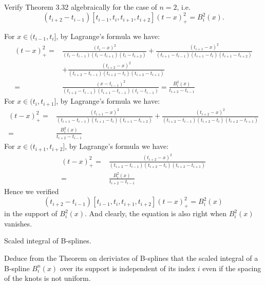 \documentclass[11pt]{elegantbook}
\begin{document}
\vspace{1.5em}

\begin{problem}
  Verify Theorem 3.32 algebraically for the case of $n=2$, i.e.
  \begin{equation*}
    (t_{i+2}-t_{i-1})[t_{i-1},t_i,t_{i+1},t_{i+2}](t-x)_+^2=B_i^2(x).
  \end{equation*}
\end{problem}

\begin{solution}
  For $x\in(t_{i-1},t_i]$, by Lagrange's formula we have:
  \begin{align*}
    [t_{i-1},t_i,t_{i+1},t_{i+2}](t-x)_+^2=&\frac{(t_i-x)^2}{(t_i-t_{i-1})(t_{i}-t_{i+1})(t_i-t_{i+2})}+\frac{(t_{i+1}-x)^2}{(t_{i+1}-t_{i-1})(t_{i+1}-t_{i})(t_{i+1}-t_{i+2})}\\
    &+\frac{(t_{i+2}-x)^2}{(t_{i+2}-t_{i-1})(t_{i+2}-t_{i})(t_{i+2}-t_{i+1})}\\
    =&\frac{(x-t_{i-1})^2}{(t_{i+2}-t_{i-1})(t_{i+1}-t_{i-1})(t_i-t_{i-1})}=\frac{B_i^2(x)}{t_{i+2}-t_{i-1}}
  \end{align*}
  For $x\in(t_{i},t_{i+1}]$, by Lagrange's formula we have:
  \begin{align*}
    [t_{i-1},t_i,t_{i+1},t_{i+2}](t-x)_+^2=&\frac{(t_{i+1}-x)^2}{(t_{i+1}-t_{i-1})(t_{i+1}-t_{i})(t_{i+1}-t_{i+2})}+\frac{(t_{i+2}-x)^2}{(t_{i+2}-t_{i-1})(t_{i+2}-t_{i})(t_{i+2}-t_{i+1})}\\
    =&\frac{B_i^2(x)}{t_{i+2}-t_{i-1}}
  \end{align*}
  For $x\in(t_{i+1},t_{i+2}]$, by Lagrange's formula we have:
  \begin{align*}
    [t_{i-1},t_i,t_{i+1},t_{i+2}](t-x)_+^2=&\frac{(t_{i+2}-x)^2}{(t_{i+2}-t_{i-1})(t_{i+2}-t_{i})(t_{i+2}-t_{i+1})}\\
    =&\frac{B_i^2(x)}{t_{i+2}-t_{i-1}}
  \end{align*}
  Hence we verified
  \begin{equation*}
    (t_{i+2}-t_{i-1})[t_{i-1},t_i,t_{i+1},t_{i+2}](t-x)_+^2=B_i^2(x)
  \end{equation*}
  in the support of $B_i^2(x)$. And clearly, the equation is also right when $B_i^2(x)$ vanishes.
\end{solution}

\vspace{1.5em}

\begin{problem}
  Scaled integral of B-splines.

  Deduce from the Theorem on deriviates of B-splines that the scaled integral of a B-spline $B_i^n(x)$ over its support is independent of its index $i$ even if the spacing of the knots is not uniform.
\end{problem}
\end{document}
